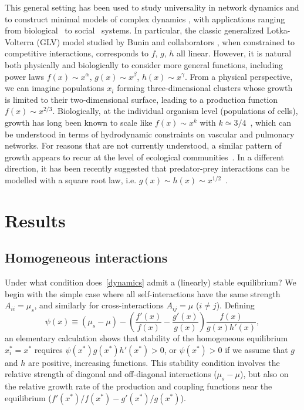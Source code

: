 \documentclass[
 pre,
 twocolumn,
 amsmath,
 amssymb,
 aps,
]{revtex4-2}
\begin{document}
This general setting has been used to study universality in network dynamics \cite{Barzel2013} and to construct minimal models of complex dynamics \cite{Barzel2015}, with applications ranging from biological~\cite{Alon2006,Karlebach2008} 
to social~\cite{Pastor-Satorras2001,Hufnagel2004,Dodds2005} systems.
In particular, the classic generalized Lotka-Volterra (GLV) model studied by Bunin and collaborators \cite{bunin2017ecological, biroli2018marginally}, when constrained to competitive interactions, corresponds to $f$, $g$, $h$ all linear. However, it is natural both physically and biologically to consider more general functions, including power laws $f(x)\sim x^\alpha$, $g(x)\sim x^\beta$, $h(x) \sim x^\gamma$.
From a physical perspective, we can imagine populations $x_i$ forming three-dimensional clusters whose growth is limited to their two-dimensional surface, leading to a production function $f(x) \sim x^{2/3}$.
Biologically, at the individual organism level (populations of cells), growth has long been known to scale like $f(x) \sim x^k$ with $k\simeq 3/4$~\cite{Brown2004}, which can be understood in terms of hydrodynamic constraints on vascular and pulmonary networks.
For reasons that are not currently understood, a similar pattern of growth appears to recur at the level of ecological communities~\cite{Hatton2015,Hatton2024}.
In a different direction, it has been recently suggested that predator-prey interactions can be modelled with a square root law, i.e. $g(x) \sim h(x) \sim x^{1/2}$~\cite{Barbier2021,mazzarisi2024}.

\section{Results}
\subsection{Homogeneous interactions}
Under what condition does~\eqref{dynamics} admit a (linearly) stable equilibrium? 
We begin with the simple case where all self-interactions have the same strength $A_{ii} = \mu_s$, and similarly for cross-interactions $A_{ij} = \mu$ ($i\neq j$).
Defining 
\begin{equation}
    \psi(x) \equiv (\mu_s - \mu) -  \left(\frac{f'(x)}{f(x)} - \frac{g'(x)}{g(x)}\right)\frac{f(x)}{g(x)h'(x)},
    \label{eq: psi}
\end{equation}
an elementary calculation shows that stability of the homogeneous equilibrium $x_i^* = x^*$ requires $\psi(x^*)g(x^*)h'(x^*) > 0$, or $\psi(x^*)>0$ if we assume that $g$ and $h$ are positive, increasing functions. This stability condition involves the relative strength of diagonal and off-diagonal interactions ($\mu_s - \mu$), but also on the relative growth rate of the production and coupling functions near the equilibrium ($f'(x^*)/f(x^*) - g'(x^*)/g(x^*)$).
\end{document}
